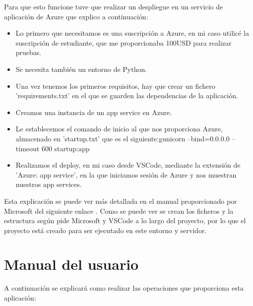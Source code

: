 Para que esto funcione tuve que realizar un despliegue en un servicio de aplicación de Azure que explico a continuación:\newline
\begin{itemize}
    \item Lo primero que necesitamos es una suscripción a Azure, en mi caso utilicé la suscripción de estudiante, que me proporcionaba 100USD para realizar pruebas.
    \item Se necesita también un entorno de Python.
    \item Una vez tenemos los primeros requisitos, hay que crear un fichero 'requirements.txt' en el que se guarden las dependencias de la aplicación.
    \item Creamos una instancia de un app service en Azure.
    \item Le establecemos el comando de inicio al que nos proporciona Azure, almacenado en 'startup.txt' que es el siguiente:\newline gunicorn --bind=0.0.0.0 --timeout 600 startup:app
    \item Realizamos el deploy, en mi caso desde VSCode, mediante la extensión de 'Azure: app service', en la que iniciamos sesión de Azure y nos muestran nuestros app services.
\end{itemize}
Esta explicación se puede ver más detallada en el manual proporcionado por Microsoft del siguiente enlace \cite{deployVSCode}.\newline
Como se puede ver se crean los ficheros y la estructura según pide Microsoft y VSCode a lo largo del proyecto, por lo que el proyecto está creado para ser ejecutado en este entorno y servidor.


\section{Manual del usuario}
A continuación se explicará como realizar las operaciones que proporciona esta aplicación:
